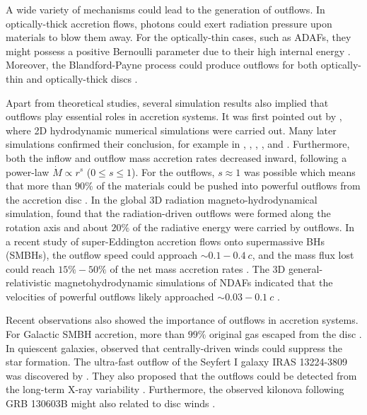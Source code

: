\documentclass[a4paper,fleqn,usenatbib]{mnras}
\begin{document}
A wide variety of mechanisms could lead to the generation of outflows. In optically-thick accretion flows, photons could exert radiation pressure upon materials to blow them away. For the optically-thin cases, such as ADAFs, they might possess a positive Bernoulli parameter due to their high internal energy \citep{Narayan1994,Gu2015}. Moreover, the Blandford-Payne process \citep{Blandford1982} could produce outflows for both optically-thin and optically-thick discs \citep[e.g.,][]{Ma2018}.

Apart from theoretical studies, several simulation results also implied that outflows play essential roles in accretion systems. It was first pointed out by \citet[]{Stone1999}, where 2D hydrodynamic numerical simulations were carried out. Many later simulations confirmed their conclusion, for example in \citet[]{Hawley2001}, \citet{Machida2001}, \citet{Igumenshchev2003}, \citet{Pang2011}, and \citet{Yuan2014}. Furthermore, both the inflow and outflow mass accretion rates decreased inward, following a power-law $\dot{M}\propto r^s$ ($0\leq s\leq 1$). For the outflows, $s\approx 1$ was possible which means that more than $90\%$ of the materials could be pushed into powerful outflows from the accretion disc \citep[e.g.,][]{Yuan2012a,Yuan2012b,Begelman2012}. In the global 3D radiation magneto-hydrodynamical simulation, \citet{Jiang2014} found that the radiation-driven outflows were formed along the rotation axis and about $20\%$ of the radiative energy were carried by outflows. In a recent study of super-Eddington accretion flows onto supermassive BHs (SMBHs), the outflow speed could approach $\sim 0.1-0.4~c$, and the mass flux lost could reach $15\%-50\%$ of the net mass accretion rates \citep{Jiang2017}. The 3D general-relativistic magnetohydrodynamic simulations of NDAFs indicated that the velocities of powerful outflows likely approached $\sim 0.03-0.1~c$ \citep[e.g.,][]{Siegel2017}.

Recent observations also showed the importance of outflows in accretion systems. For Galactic SMBH accretion, more than $99\%$ original gas escaped from the disc \citep{Wang2013}. In quiescent galaxies, \citet{Cheung2016} observed that centrally-driven winds could suppress the star formation. The ultra-fast outflow of the Seyfert I galaxy IRAS 13224-3809 was discovered by \citet{Parker2017a}. They also proposed that the outflows could be detected from the long-term X-ray variability \citep{Parker2017b}. Furthermore, the observed kilonova following GRB 130603B \citep{Berger2013a,Tanvir2013} might also related to disc winds \citep[e.g.,][]{Metzger2014a}.
\end{document}
